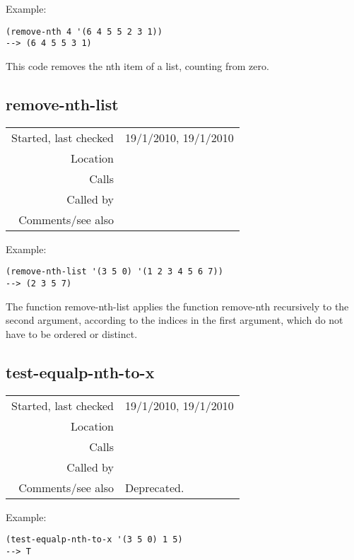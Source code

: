 \vspace{0.5cm}
\noindent Example:
\begin{verbatim}
(remove-nth 4 '(6 4 5 5 2 3 1))
--> (6 4 5 5 3 1)
\end{verbatim}

\noindent This code removes the nth item of a list,
counting from zero.


\subsection*{remove-nth-list}\label{fun:remove-nth-list}

\vspace{0.3cm}
\begin{tabular}{r|p{8cm}}
Started, last checked & 19/1/2010, 19/1/2010 \\
Location & \nameref{sec:list-processing} \\
Calls & \nameref{fun:remove-nth} \\
Called by & \\
Comments/see also &
\end{tabular}

\vspace{0.5cm}
\noindent Example:
\begin{verbatim}
(remove-nth-list '(3 5 0) '(1 2 3 4 5 6 7))
--> (2 3 5 7)
\end{verbatim}

\noindent The function remove-nth-list applies the
function remove-nth recursively to the second
argument, according to the indices in the first
argument, which do not have to be ordered or
distinct.


\subsection*{test-equalp-nth-to-x}\label{fun:test-equalp-nth-to-x}

\vspace{0.3cm}
\begin{tabular}{r|p{8cm}}
Started, last checked & 19/1/2010, 19/1/2010 \\
Location & \nameref{sec:list-processing} \\
Calls & \\
Called by & \\
Comments/see also & Deprecated.
\end{tabular}

\vspace{0.5cm}
\noindent Example:
\begin{verbatim}
(test-equalp-nth-to-x '(3 5 0) 1 5)
--> T
\end{verbatim}

